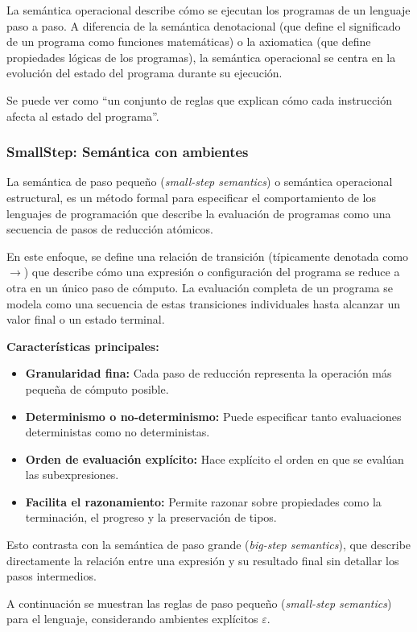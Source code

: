 \documentclass[a4paper,12pt]{article}
\begin{document}
La semántica operacional describe cómo se ejecutan los programas de un lenguaje paso a paso. A diferencia de la semántica denotacional (que define el significado de un programa como funciones matemáticas) o la axiomatica (que define propiedades lógicas de los programas), la semántica operacional se centra en la evolución del estado del programa durante su ejecución.

Se puede ver como “un conjunto de reglas que explican cómo cada instrucción afecta al estado del programa”.

\subsubsection*{SmallStep: Semántica con ambientes}

\begin{tcolorbox}[title= Correción:Definición Notación de Paso Pequeño\textit{(small-step)}   MÓDULO A5]

La semántica de paso pequeño (\textit{small-step semantics}) o semántica operacional estructural, es un método formal para especificar el comportamiento de los lenguajes de programación que describe la evaluación de programas como una secuencia de pasos de reducción atómicos.

En este enfoque, se define una relación de transición (típicamente denotada como \(\to\)) que describe cómo una expresión o configuración del programa se reduce a otra en un único paso de cómputo. La evaluación completa de un programa se modela como una secuencia de estas transiciones individuales hasta alcanzar un valor final o un estado terminal.

\textbf{Características principales:}

\begin{itemize}
    \item \textbf{Granularidad fina:} Cada paso de reducción representa la operación más pequeña de cómputo posible.
    \item \textbf{Determinismo o no-determinismo:} Puede especificar tanto evaluaciones deterministas como no deterministas.
    \item \textbf{Orden de evaluación explícito:} Hace explícito el orden en que se evalúan las subexpresiones.
    \item \textbf{Facilita el razonamiento:} Permite razonar sobre propiedades como la terminación, el progreso y la preservación de tipos.
\end{itemize}


Esto contrasta con la semántica de paso grande (\textit{big-step semantics}), que describe directamente la relación entre una expresión y su resultado final sin detallar los pasos intermedios.\cite{plotkin2004,pierce2002,wright1994}

    
\end{tcolorbox}
A continuación se muestran las reglas de paso pequeño (\textit{small-step semantics\footnotemark}) 
para el lenguaje, considerando ambientes explícitos $\varepsilon$.
\end{document}
